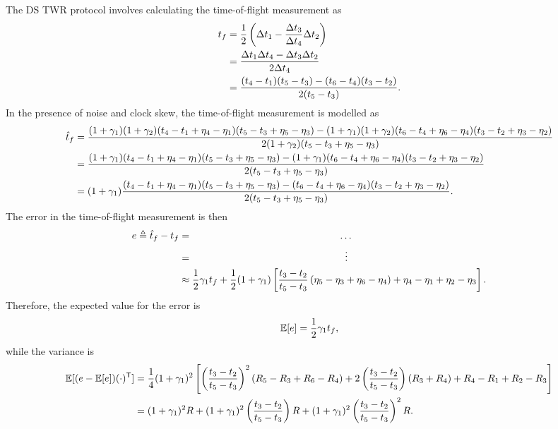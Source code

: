 \documentclass{decar-wsd}    %
\begin{document}
The DS TWR protocol involves calculating the time-of-flight measurement as 
\begin{align}
    t_f &= \frac{1}{2} \left( \Delta t_1 - \frac{\Delta t_3}{\Delta t_4} \Delta t_2 \right) \\
    &= \frac{\Delta t_1 \Delta t_4 - \Delta t_3 \Delta t_2}{2 \Delta t_4} \\
    &= \frac{(t_4 - t_1)(t_5 - t_3) - (t_6 - t_4)(t_3 - t_2)}{2(t_5 - t_3)}.
\end{align}
In the presence of noise and clock skew, the time-of-flight measurement is modelled as 
\begin{align}
    \hat{t}_f &= \frac{(1+\gamma_1)(1+\gamma_2)(t_4 - t_1 + \eta_4 - \eta_1)(t_5 - t_3 + \eta_5 - \eta_3) - (1+\gamma_1)(1+\gamma_2)(t_6 - t_4 + \eta_6 - \eta_4)(t_3 - t_2 + \eta_3 - \eta_2)}{2(1+\gamma_2)(t_5 - t_3 + \eta_5 - \eta_3)} \\
    &= \frac{(1+\gamma_1)(t_4 - t_1 + \eta_4 - \eta_1)(t_5 - t_3 + \eta_5 - \eta_3) - (1+\gamma_1)(t_6 - t_4 + \eta_6 - \eta_4)(t_3 - t_2 + \eta_3 - \eta_2)}{2(t_5 - t_3 + \eta_5 - \eta_3)} \\
    &= (1+\gamma_1) \frac{(t_4 - t_1 + \eta_4 - \eta_1)(t_5 - t_3 + \eta_5 - \eta_3) - (t_6 - t_4 + \eta_6 - \eta_4)(t_3 - t_2 + \eta_3 - \eta_2)}{2(t_5 - t_3 + \eta_5 - \eta_3)}.
\end{align}
The error in the time-of-flight measurement is then
\begin{align}
    e \triangleq \hat{t}_f - t_f &= \hspace{150pt} \ldots \\
    &= \hspace{155pt} \vdots \\
    &\approx \f{1}{2} \gamma_1 t_f + \f{1}{2} (1 + \gamma_1) \left[ \f{t_3 - t_2}{t_5 - t_3} \left( \eta_5 - \eta_3 + \eta_6 - \eta_4 \right) + \eta_4 - \eta_1 + \eta_2 - \eta_3 \right].
\end{align}
Therefore, the expected value for the error is
\begin{equation}
    \mathbb{E}[e] = \frac{1}{2} \gamma_1 t_f,
\end{equation}
while the variance is 
\begin{align}
    \mathbb{E}[(e - \mathbb{E}[e])(\cdot)^{\mathsf{T}}] &= \frac{1}{4} (1 + \gamma_1)^2 \left[ \left(\frac{t_3 - t_2}{t_5 - t_3}\right)^2 \left( R_5 - R_3 + R_6 - R_4 \right) + 2\left(\frac{t_3 - t_2}{t_5 - t_3}\right) \left( R_3 + R_4 \right) + R_4 - R_1 + R_2 - R_3 \right] \\
    &= (1 + \gamma_1)^2 R + (1 + \gamma_1)^2 \left(\frac{t_3 - t_2}{t_5 - t_3}\right) R + (1 + \gamma_1)^2 \left(\frac{t_3 - t_2}{t_5 - t_3}\right)^2 R. \label{eq:ds_uncertainty}
\end{align}
\end{document}
